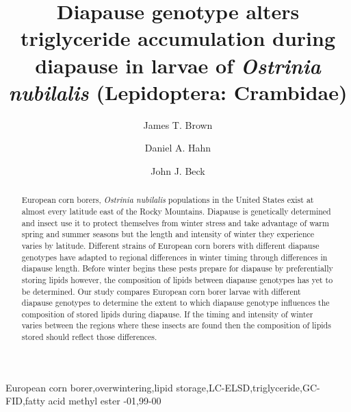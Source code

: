 \documentclass[review]{elsarticle}
\begin{document}
\begin{frontmatter}

\title{Diapause genotype alters triglyceride accumulation during diapause in larvae of \textit{Ostrinia nubilalis} (Lepidoptera: Crambidae)}


\author[usda,uf]{James T. Brown}

\author[uf]{Daniel A. Hahn}
\author[usda]{John J. Beck}

\address[usda]{USDA‐ARS Center for Medical, Agricultural, and Veterinary Entomology, 1700 SW 23rd Drive, Gainesville, FL 32608, USA}

\address[uf]{Department of Entomology and Nematology, University of Florida, Gainesville, FL 32611}



\begin{abstract}
European corn borers, \textit{Ostrinia nubilalis} populations in the United States exist at almost every latitude east of the Rocky Mountains. Diapause is genetically determined and insect use it to protect themselves from winter stress and take advantage of warm spring and summer seasons but the length and intensity of winter they experience varies by latitude. Different strains of European corn borers with different diapause genotypes have adapted to regional differences in winter timing through differences in diapause length. Before winter begins these pests prepare for diapause by preferentially storing lipids however, the composition of lipids between diapause genotypes has yet to be determined. Our study compares European corn borer larvae with different diapause genotypes to determine the extent to which diapause genotype influences the composition of stored lipids during diapause. If the timing and intensity of winter varies between the regions where these insects are found then the composition of lipids stored should reflect those differences. 
\end{abstract}

\begin{keyword}
\textttInsect European corn borer\sep overwintering\sep lipid storage\sep LC-ELSD\sep triglyceride\sep GC-FID\sep fatty acid methyl ester 
-01\sep  99-00
\end{keyword}

\end{frontmatter}
\end{document}
